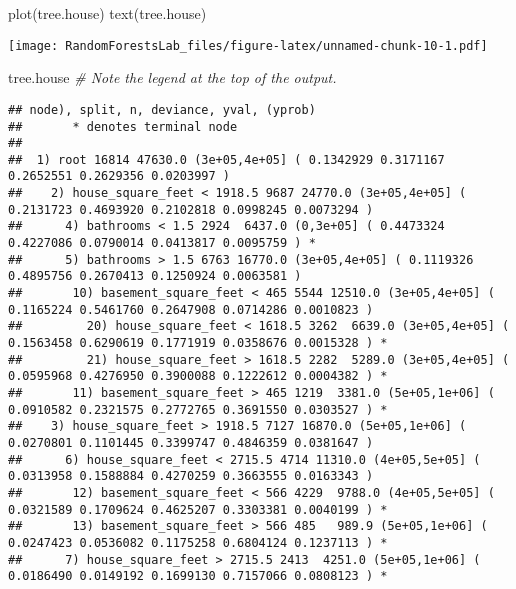 \documentclass[
]{article}
\newenvironment{Shaded}{\begin{snugshade}}{\end{snugshade}}
\newcommand{\AttributeTok}[1]{\textcolor[rgb]{0.77,0.63,0.00}{#1}}
\newcommand{\CommentTok}[1]{\textcolor[rgb]{0.56,0.35,0.01}{\textit{#1}}}
\newcommand{\FunctionTok}[1]{\textcolor[rgb]{0.00,0.00,0.00}{#1}}
\newcommand{\NormalTok}[1]{#1}
\newcommand{\OtherTok}[1]{\textcolor[rgb]{0.56,0.35,0.01}{#1}}
\newcommand{\SpecialCharTok}[1]{\textcolor[rgb]{0.00,0.00,0.00}{#1}}
\newcommand{\StringTok}[1]{\textcolor[rgb]{0.31,0.60,0.02}{#1}}
\begin{document}
\begin{Shaded}
\begin{Highlighting}[]
\FunctionTok{plot}\NormalTok{(tree.house)}
\FunctionTok{text}\NormalTok{(tree.house) }
\end{Highlighting}
\end{Shaded}

\texttt{[image: RandomForestsLab\_files/figure-latex/unnamed-chunk-10-1.pdf]}

\begin{Shaded}
\begin{Highlighting}[]
\NormalTok{tree.house }\CommentTok{\# Note the legend at the top of the output.}
\end{Highlighting}
\end{Shaded}

\begin{verbatim}
## node), split, n, deviance, yval, (yprob)
##       * denotes terminal node
## 
##  1) root 16814 47630.0 (3e+05,4e+05] ( 0.1342929 0.3171167 0.2652551 0.2629356 0.0203997 )  
##    2) house_square_feet < 1918.5 9687 24770.0 (3e+05,4e+05] ( 0.2131723 0.4693920 0.2102818 0.0998245 0.0073294 )  
##      4) bathrooms < 1.5 2924  6437.0 (0,3e+05] ( 0.4473324 0.4227086 0.0790014 0.0413817 0.0095759 ) *
##      5) bathrooms > 1.5 6763 16770.0 (3e+05,4e+05] ( 0.1119326 0.4895756 0.2670413 0.1250924 0.0063581 )  
##       10) basement_square_feet < 465 5544 12510.0 (3e+05,4e+05] ( 0.1165224 0.5461760 0.2647908 0.0714286 0.0010823 )  
##         20) house_square_feet < 1618.5 3262  6639.0 (3e+05,4e+05] ( 0.1563458 0.6290619 0.1771919 0.0358676 0.0015328 ) *
##         21) house_square_feet > 1618.5 2282  5289.0 (3e+05,4e+05] ( 0.0595968 0.4276950 0.3900088 0.1222612 0.0004382 ) *
##       11) basement_square_feet > 465 1219  3381.0 (5e+05,1e+06] ( 0.0910582 0.2321575 0.2772765 0.3691550 0.0303527 ) *
##    3) house_square_feet > 1918.5 7127 16870.0 (5e+05,1e+06] ( 0.0270801 0.1101445 0.3399747 0.4846359 0.0381647 )  
##      6) house_square_feet < 2715.5 4714 11310.0 (4e+05,5e+05] ( 0.0313958 0.1588884 0.4270259 0.3663555 0.0163343 )  
##       12) basement_square_feet < 566 4229  9788.0 (4e+05,5e+05] ( 0.0321589 0.1709624 0.4625207 0.3303381 0.0040199 ) *
##       13) basement_square_feet > 566 485   989.9 (5e+05,1e+06] ( 0.0247423 0.0536082 0.1175258 0.6804124 0.1237113 ) *
##      7) house_square_feet > 2715.5 2413  4251.0 (5e+05,1e+06] ( 0.0186490 0.0149192 0.1699130 0.7157066 0.0808123 ) *
\end{verbatim}

\begin{Shaded}
\end{Shaded}
\end{document}
